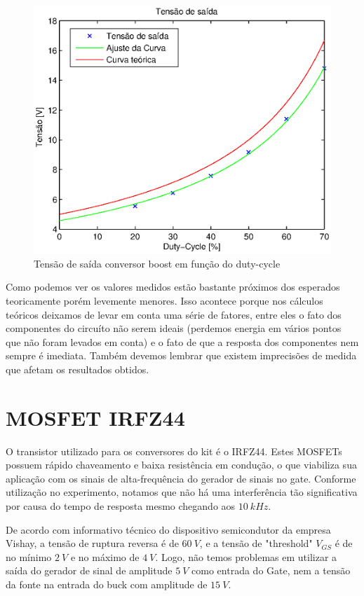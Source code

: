 \documentclass{article}
\begin{document}
\begin{figure}[H]
	\centering
	\includegraphics[width=0.7\linewidth]{Dados/boost/tvd}
	\caption{Tensão de saída conversor boost em função do duty-cycle}
	\label{fig:botvd}
\end{figure}

Como podemos ver os valores medidos estão bastante próximos dos esperados teoricamente porém levemente menores. Isso acontece porque nos cálculos teóricos deixamos de levar em conta uma série de fatores, entre eles o fato dos componentes do circuíto não serem ideais (perdemos energia em vários pontos que não foram levados em conta) e o fato de que a resposta dos componentes nem sempre é imediata. Também devemos lembrar que existem imprecisões de medida que afetam os resultados obtidos.

\section{MOSFET IRFZ44}

O transistor utilizado para os conversores do kit é o IRFZ44. Estes MOSFETs possuem rápido chaveamento e baixa resistência em condução, o que viabiliza sua aplicação com os sinais de alta-frequência do gerador de sinais no gate. Conforme utilização no experimento, notamos que não há uma interferência tão significativa por causa do tempo de resposta mesmo chegando aos $10\ kHz$.

De acordo com informativo técnico do dispositivo semicondutor da empresa Vishay, a tensão de ruptura reversa é de $60\ V$, e a tensão de "threshold" $V_{GS}$ é de no mínimo $2\ V$ e no máximo de $4\ V$. Logo, não temos problemas em utilizar a saída do gerador de sinal de amplitude $5\ V$ como entrada do Gate, nem a tensão da fonte na entrada do buck com amplitude de $15\ V$.
\end{document}
